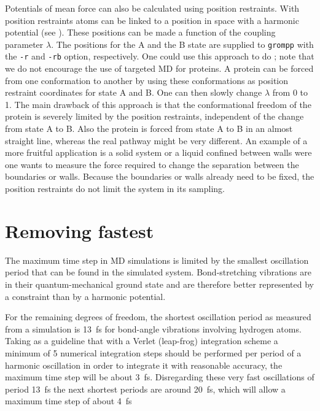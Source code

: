 Potentials of mean force can also be calculated using position restraints.
With position restraints atoms can be linked to a position in space
with a harmonic potential (see ).
These positions can be made a function of the coupling parameter $\lambda$.
The positions for the A and the B state are supplied to {\tt grompp} with
the {\tt -r} and {\tt -rb} option, respectively.
One could use this approach to do ;
note that we do not encourage the use of targeted MD for proteins.
A protein can be forced from one conformation to another by using
these conformations as position restraint coordinates for state A and B.
One can then slowly change $\lambda$ from 0 to 1.
The main drawback of this approach is that the conformational freedom
of the protein is severely limited by the position restraints,
independent of the change from state A to B.
Also the protein is forced from state A to B in an almost straight line,
whereas the real pathway might be very different.
An example of a more fruitful application is a solid system or a liquid
confined between walls were one wants to measure the force required
to change the separation between the boundaries or walls.
Because the boundaries or walls already need to be fixed,
the position restraints do not limit the system in its sampling.

\newcommand{\amine}{\sf -NH$_2$}
\newcommand{\amines}{\sf -NH-}
\newcommand{\aminep}{\sf -NH$_3^+$}
\section{Removing fastest }
The maximum time step in MD simulations is limited by the smallest
oscillation period that can be found in the simulated
system. Bond-stretching vibrations are in their quantum-mechanical
ground state and are therefore better represented by a constraint than
by a harmonic potential.

For the remaining degrees of freedom, the shortest oscillation period
as measured from a simulation is 13~fs for bond-angle vibrations
involving hydrogen atoms. Taking as a guideline that with a Verlet
(leap-frog) integration scheme a minimum of 5 numerical integration
steps should be performed per period of a harmonic oscillation in
order to integrate it with reasonable accuracy, the maximum time step
will be about 3~fs. Disregarding these very fast oscillations of
period 13~fs the next shortest periods are around 20~fs, which will
allow a maximum time step of about 4~fs

